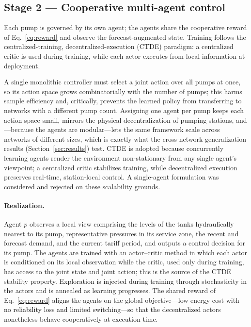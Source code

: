 \documentclass[11pt,a4paper]{article}
\begin{document}
\subsection{Stage 2 --- Cooperative multi-agent control}
\label{sec:stage2}
Each pump is governed by its own agent; the agents share the cooperative reward
of Eq.~\eqref{eq:reward} and observe the forecast-augmented state. Training
follows the centralized-training, decentralized-execution (CTDE) paradigm: a
centralized critic is used during training, while each actor executes from local
information at deployment.

A single monolithic controller must select a joint
action over all pumps at once, so its action space grows combinatorially with the
number of pumps; this harms sample efficiency and, critically, prevents the
learned policy from transferring to networks with a different pump count.
Assigning one agent per pump keeps each action space small, mirrors the physical
decentralization of pumping stations, and---because the agents are modular---lets
the same framework scale across networks of different sizes, which is exactly
what the cross-network generalization results (Section~\ref{sec:results})
test. CTDE is adopted because concurrently learning agents render the environment
non-stationary from any single agent's viewpoint; a centralized critic stabilizes
training, while decentralized execution preserves real-time, station-local
control. A single-agent formulation was considered and rejected on these
scalability grounds.

\paragraph{Realization.} Agent $p$ observes a local view comprising the levels of
the tanks hydraulically nearest to its pump, representative pressures in its
service zone, the recent and forecast demand, and the current tariff period, and
outputs a control decision for its pump. The agents are trained with an
actor--critic method in which each actor is conditioned on its local observation
while the critic, used only during training, has access to the joint state and
joint action; this is the source of the CTDE stability property. Exploration is
injected during training through stochasticity in the actors and is annealed as
learning progresses. The shared reward of Eq.~\eqref{eq:reward} aligns the agents
on the global objective---low energy cost with no reliability loss and limited
switching---so that the decentralized actors nonetheless behave cooperatively at
execution time.
\end{document}
